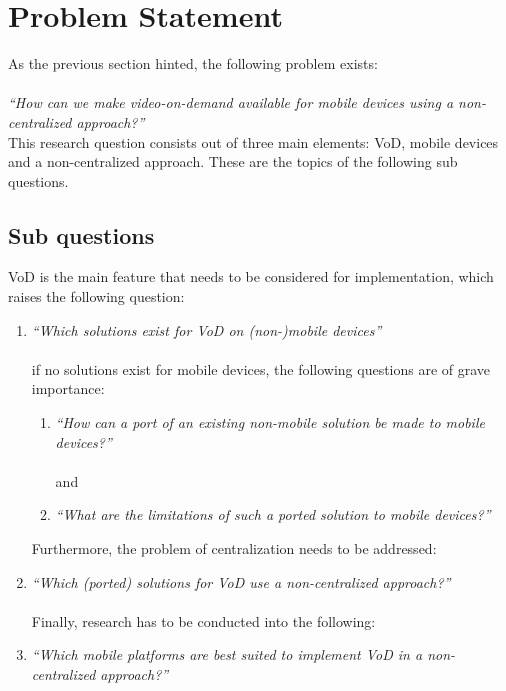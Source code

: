 \section{Problem Statement}
As the previous section hinted, the following problem exists:\\
\\
\textit{``How can we make video-on-demand available for mobile devices using a non-centralized approach?''}\\

This research question consists out of three main elements: VoD, mobile devices and a non-centralized approach. These are the topics of  the following sub questions.

\subsection{Sub questions}
VoD is the main feature that needs to be considered for implementation, which raises the following question:
\begin{enumerate}
	\item\textit{``Which solutions exist for VoD on (non-)mobile devices''}\\
	\\if no solutions exist for mobile devices, the following questions are of grave importance:\\
		\begin{enumerate}
			\item\textit{``How can a port of an existing non-mobile solution be made to mobile devices?''}\\
			\\and\\
			\item\textit{``What are the limitations of such a ported solution to mobile devices?''}\\
		\end{enumerate}
	Furthermore, the problem of centralization needs to be addressed:\\
	\item\textit{``Which (ported) solutions for VoD use a non-centralized approach?''}\\
	\\Finally, research has to be conducted into the following:\\
	\item\textit{``Which mobile platforms are best suited to implement VoD in a non-centralized approach?''}\\
\end{enumerate}
